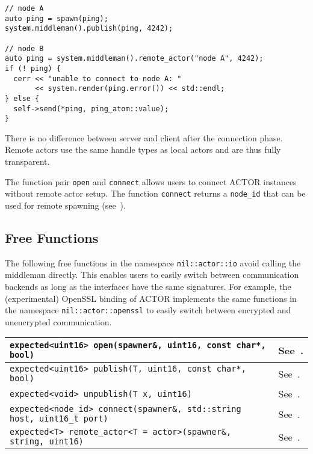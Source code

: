 \begin{lstlisting}
// node A
auto ping = spawn(ping);
system.middleman().publish(ping, 4242);

// node B
auto ping = system.middleman().remote_actor("node A", 4242);
if (! ping) {
  cerr << "unable to connect to node A: "
       << system.render(ping.error()) << std::endl;
} else {
  self->send(*ping, ping_atom::value);
}
\end{lstlisting}

There is no difference between server and client after the connection phase.
Remote actors use the same handle types as local actors and are thus fully
transparent.

The function pair \lstinline^open^ and \lstinline^connect^ allows users to
connect ACTOR instances without remote actor setup. The function
\lstinline^connect^ returns a \lstinline^node_id^ that can be used for remote
spawning (see~).

\subsection{Free Functions}
\label{free-remoting-functions}

The following free functions in the namespace \lstinline^nil::actor::io^ avoid calling
the middleman directly. This enables users to easily switch between
communication backends as long as the interfaces have the same signatures. For
example, the (experimental) OpenSSL binding of ACTOR implements the same
functions in the namespace \lstinline^nil::actor::openssl^ to easily switch between
encrypted and unencrypted communication.

\begin{center}
\begin{tabular}{ll}
  \hline
  \lstinline^expected<uint16> open(spawner&, uint16, const char*, bool)^ & See~. \\
  \hline
  \lstinline^expected<uint16> publish(T, uint16, const char*, bool)^ & See~. \\
  \hline
  \lstinline^expected<void> unpublish(T x, uint16)^ & See~. \\
  \hline
  \lstinline^expected<node_id> connect(spawner&, std::string host, uint16_t port)^ & See~. \\
  \hline
  \lstinline^expected<T> remote_actor<T = actor>(spawner&, string, uint16)^ & See~. \\
  \hline
\end{tabular}
\end{center}

